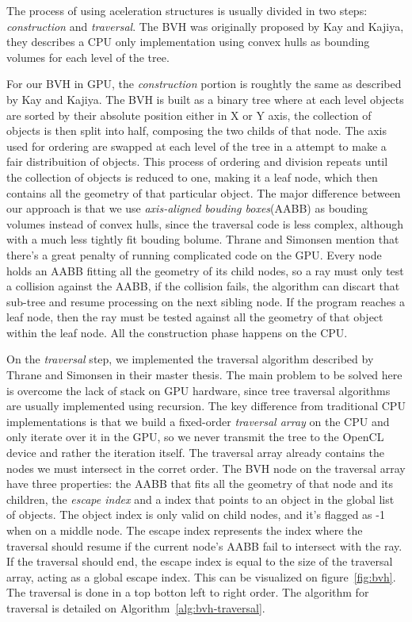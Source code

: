 \documentclass{vgtc}
\begin{document}
The process of using aceleration structures is usually divided in two
steps: \emph{construction} and \emph{traversal}. The BVH was
originally proposed by Kay and Kajiya\cite{kay1986ray}, they describes
a CPU only implementation using convex hulls as bounding volumes for
each level of the tree.

For our BVH in GPU, the \emph{construction} portion is roughtly the
same as described by Kay and Kajiya. The BVH is built as a binary tree
where at each level objects are sorted by their absolute position
either in X or Y axis, the collection of objects is then split into
half, composing the two childs of that node. The axis used for
ordering are swapped at each level of the tree in a attempt to make a
fair distribuition of objects. This process of ordering and division
repeats until the collection of objects is reduced to one, making it a
leaf node, which then contains all the geometry of that particular
object. The major difference between our approach is that we use
\emph{axis-aligned bouding boxes}(AABB) as bouding volumes instead of
convex hulls, since the traversal code is less complex, although with
a much less tightly fit bouding bolume. Thrane and Simonsen mention
that there's a great penalty of running complicated code on the
GPU\cite{Thrane}. Every node holds an AABB fitting all the geometry of
its child nodes, so a ray must only test a collision against the AABB,
if the collision fails, the algorithm can discart that sub-tree and
resume processing on the next sibling node. If the program reaches a
leaf node, then the ray must be tested against all the geometry of
that object within the leaf node. All the construction phase happens
on the CPU.

On the \emph{traversal} step, we implemented the traversal algorithm
described by Thrane and Simonsen in their master thesis. The main
problem to be solved here is overcome the lack of stack on GPU
hardware, since tree traversal algorithms are usually implemented
using recursion. The key difference from traditional CPU
implementations is that we build a fixed-order \emph{traversal array}
on the CPU and only iterate over it in the GPU, so we never transmit
the tree to the OpenCL device and rather the iteration itself. The
traversal array already contains the nodes we must intersect in the
corret order. The BVH node on the traversal array have three
properties: the AABB that fits all the geometry of that node and its
children, the \emph{escape index} and a index that points to an object
in the global list of objects. The object index is only valid on child
nodes, and it's flagged as -1 when on a middle node. The escape index
represents the index where the traversal should resume if the current
node's AABB fail to intersect with the ray. If the traversal should
end, the escape index is equal to the size of the traversal array,
acting as a global escape index. This can be visualized on
figure~\ref{fig:bvh}. The traversal is done in a top botton left to
right order. The algorithm for traversal is detailed on
Algorithm~\ref{alg:bvh-traversal}.
\end{document}
